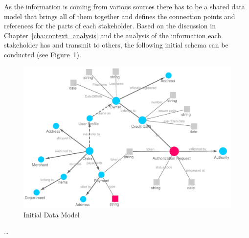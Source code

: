 As the information is coming from various sources there has to be a shared data model that brings all of them together and defines the connection points and references for the parts of each stakeholder. Based on the discussion in Chapter~\ref{cha:context_analysis} and the analysis of the information each stakeholder has and transmit to others, the following initial schema can be conducted (see Figure~\ref{fig:images_data_model}).\@

\begin{figure}[H]
	\centering
		\includegraphics[width=0.8\columnwidth]{images/ontology_scenario_1.pdf}
	\caption{Initial Data Model}
\label{fig:images_data_model}
\end{figure}

\ldots

